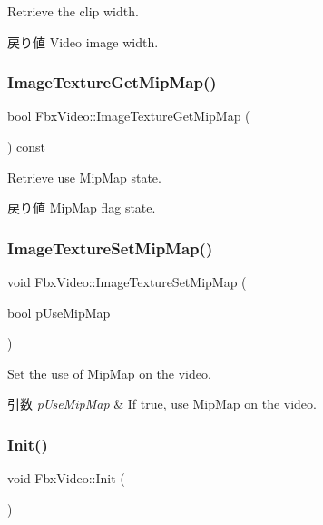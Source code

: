 Retrieve the clip width. \begin{DoxyReturn}{戻り値}
Video image width. 
\end{DoxyReturn}
\mbox{\label{class_fbx_video_a71d943f108e39aa4bdec2a55d7d2468a}} 
\subsubsection{\texorpdfstring{Image\+Texture\+Get\+Mip\+Map()}{ImageTextureGetMipMap()}}
{\footnotesize\ttfamily bool Fbx\+Video\+::\+Image\+Texture\+Get\+Mip\+Map (\begin{DoxyParamCaption}{ }\end{DoxyParamCaption}) const}

Retrieve use Mip\+Map state. \begin{DoxyReturn}{戻り値}
Mip\+Map flag state. 
\end{DoxyReturn}
\mbox{\label{class_fbx_video_ae041331c4f831b2b55e87b4581047d74}} 
\subsubsection{\texorpdfstring{Image\+Texture\+Set\+Mip\+Map()}{ImageTextureSetMipMap()}}
{\footnotesize\ttfamily void Fbx\+Video\+::\+Image\+Texture\+Set\+Mip\+Map (\begin{DoxyParamCaption}\item[{bool}]{p\+Use\+Mip\+Map }\end{DoxyParamCaption})}

Set the use of Mip\+Map on the video. 
\begin{DoxyParams}{引数}
{\em p\+Use\+Mip\+Map} & If {\ttfamily true}, use Mip\+Map on the video. \\
\hline
\end{DoxyParams}
\mbox{\label{class_fbx_video_a7eebf649a1500d85b39a69673ef75a9c}} 
\subsubsection{\texorpdfstring{Init()}{Init()}}
{\footnotesize\ttfamily void Fbx\+Video\+::\+Init (\begin{DoxyParamCaption}{ }\end{DoxyParamCaption})\hspace{0.3cm}{\ttfamily [protected]}}

